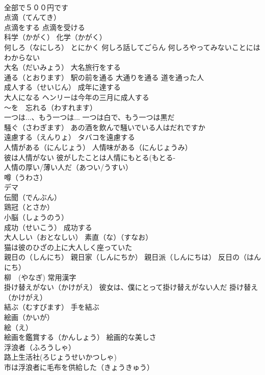 \documentclass[8pt]{extreport}
\begin{document}
\begin{CJK}{UTF8}{min}
\\	全部で５００円です
\\	点滴（てんてき）
\\	点滴をする 点滴を受ける
\\	科学（かがく） 化学（かがく）
\\	何しろ（なにしろ） とにかく 何しろ話してごらん 何しろやってみないことにはわからない
\\	大名（だいみょう） 大名旅行をする 
\\	通る（とおります） 駅の前を通る 大通りを通る 道を通った人
\\	成人する（せいじん） 成年に達する 
\\	大人になる ヘンリーは今年の三月に成人する
\\	～を　忘れる（わすれます）
\\	一つは...、もう一つは... 一つは白で、もう一つは黒だ
\\	騒ぐ（さわぎます） あの酒を飲んで騒いでいる人はだれですか
\\	遠慮する（えんりょ） タバコを遠慮する
\\	人情がある（にんじょう） 人情味がある（にんじょうみ）
\\	彼は人情がない 彼がしたことは人情にもとる(もとる-
\\	人情の厚い/薄い人だ（あつい/うすい）
\\	噂（うわさ）
\\	デマ 
\\	伝聞（でんぶん）
\\	鶏冠（とさか）
\\	小脳（しょうのう）
\\	成功（せいこう） 成功する
\\	大人しい（おとなしい） 素直（な）（すなお）
\\	猫は彼のひざの上に大人しく座っていた
\\	親日の（しんにち） 親日家（しんにちか） 親日派（しんにちは） 反日の（はんにち）
\\	柳　(やなぎ) 常用漢字
\\	掛け替えがない（かけがえ） 彼女は、僕にとって掛け替えがない人だ 掛け替え（かけがえ）
\\	結ぶ（むすびます） 手を結ぶ
\\	絵画（かいが）
\\	絵（え）
\\	絵画を鑑賞する（かんしょう） 絵画的な美しさ
\\	浮浪者（ふろうしゃ） 
\\	路上生活社(ろじょうせいかつしゃ) 
\\	市は浮浪者に毛布を供給した（きょうきゅう）

\end{CJK}
\end{document}
